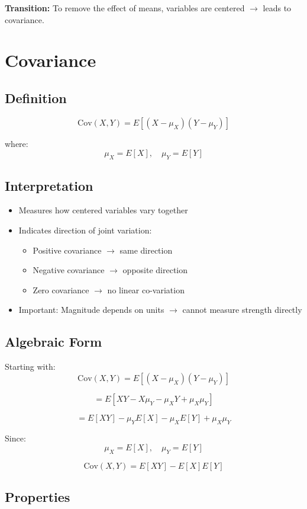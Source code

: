 \documentclass[12pt]{article}
\begin{document}
\textbf{Transition:} To remove the effect of means, variables are centered $\rightarrow$ leads to covariance.

\section{Covariance}

\subsection{Definition}

\[
\text{Cov}(X,Y) = E[(X - \mu_X)(Y - \mu_Y)]
\]

where:
\[
\mu_X = E[X], \quad \mu_Y = E[Y]
\]

\subsection{Interpretation}

\begin{itemize}
\item Measures how centered variables vary together
\item Indicates direction of joint variation:
\begin{itemize}
\item Positive covariance $\rightarrow$ same direction
\item Negative covariance $\rightarrow$ opposite direction
\item Zero covariance $\rightarrow$ no linear co-variation
\end{itemize}
\item Important: Magnitude depends on units $\rightarrow$ cannot measure strength directly
\end{itemize}

\subsection{Algebraic Form}

Starting with:
\[
\text{Cov}(X,Y) = E[(X - \mu_X)(Y - \mu_Y)]
\]

\[
= E[XY - X\mu_Y - \mu_X Y + \mu_X \mu_Y]
\]

\[
= E[XY] - \mu_Y E[X] - \mu_X E[Y] + \mu_X \mu_Y
\]

Since:
\[
\mu_X = E[X], \quad \mu_Y = E[Y]
\]

\[
\text{Cov}(X,Y) = E[XY] - E[X]E[Y]
\]

\subsection{Properties}
\end{document}
